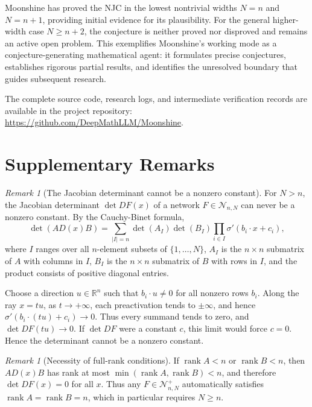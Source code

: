 \documentclass[a4paper,11pt]{article}
\theoremstyle{plain}
\theoremstyle{definition}
\theoremstyle{remark}
\newtheorem{remark}[theorem]{Remark}
\DeclareMathOperator{\rank}{rank}
\begin{document}
Moonshine has proved the NJC in the lowest nontrivial widths \(N=n\) and \(N=n+1\), providing initial evidence for its plausibility. For the general higher-width case \(N\ge n+2\), the conjecture is neither proved nor disproved and remains an active open problem. This exemplifies Moonshine's working mode as a conjecture-generating mathematical agent: it formulates precise conjectures, establishes rigorous partial results, and identifies the unresolved boundary that guides subsequent research.

The complete source code, research logs, and intermediate verification records are available in the project repository: \url{https://github.com/DeepMathLLM/Moonshine}.

\appendix
\section{Supplementary Remarks}

\begin{remark}[The Jacobian determinant cannot be a nonzero constant]
For \(N>n\), the Jacobian determinant \(\det DF(x)\) of a network \(F\in\mathcal N_{n,N}\) can never be a nonzero constant. By the Cauchy-Binet formula,
\[
\det(AD(x)B)=\sum_{|I|=n}\det(A_I)\det(B_I)\prod_{i\in I}\sigma'(b_i\cdot x+c_i),
\]
where \(I\) ranges over all \(n\)-element subsets of \(\{1,\ldots,N\}\), \(A_I\) is the \(n\times n\) submatrix of \(A\) with columns in \(I\), \(B_I\) is the \(n\times n\) submatrix of \(B\) with rows in \(I\), and the product consists of positive diagonal entries.

Choose a direction \(u\in\mathbb R^n\) such that \(b_i\cdot u\ne0\) for all nonzero rows \(b_i\). Along the ray \(x=tu\), as \(t\to+\infty\), each preactivation tends to \(\pm\infty\), and hence \(\sigma'(b_i\cdot(tu)+c_i)\to0\). Thus every summand tends to zero, and \(\det DF(tu)\to0\). If \(\det DF\) were a constant \(c\), this limit would force \(c=0\). Hence the determinant cannot be a nonzero constant.
\end{remark}

\begin{remark}[Necessity of full-rank conditions]
If \(\rank A<n\) or \(\rank B<n\), then \(AD(x)B\) has rank at most \(\min(\rank A,\rank B)<n\), and therefore \(\det DF(x)=0\) for all \(x\). Thus any \(F\in\mathcal N_{n,N}^+\) automatically satisfies \(\rank A=\rank B=n\), which in particular requires \(N\ge n\).
\end{remark}
\end{document}
